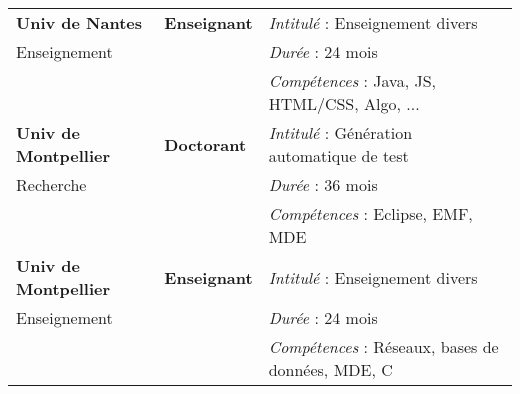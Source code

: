 \begin{tabular}{l|l|l}
\hline
{\bf Univ de Nantes} & {\bf Enseignant} & {\it Intitulé} : Enseignement divers \\
Enseignement &  & {\it Durée} : 24 mois \\
& & {\it Compétences} : Java, JS, HTML/CSS, Algo, ... \\

\hline
{\bf Univ de Montpellier} & {\bf Doctorant} & {\it Intitulé} : Génération automatique de test \\
Recherche &  & {\it Durée} : 36 mois \\
& & {\it Compétences} : Eclipse, EMF, MDE \\

\hline
{\bf Univ de Montpellier} & {\bf Enseignant} & {\it Intitulé} : Enseignement divers \\
Enseignement &  & {\it Durée} : 24 mois \\
& & {\it Compétences} : Réseaux, bases de données, MDE, C \\
\end{tabular}












